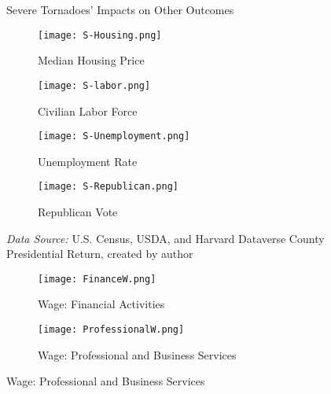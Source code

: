 \documentclass[letterpaper]{article}
\begin{document}

\begin{figure}[H]
    \centering
    
    \caption{Severe Tornadoes' Impacts on Other Outcomes}
    \label{fig4}
    \begin{subfigure}{0.5\textwidth}
        \centering
        \texttt{[image: S-Housing.png]}
        \caption{Median Housing Price}
        \label{22a}
    \end{subfigure}%
    \hfill
    \begin{subfigure}{0.5\textwidth}
        \centering
        \texttt{[image: S-labor.png]}
        \caption{Civilian Labor Force}
        \label{22b}
    \end{subfigure}
    
    \begin{subfigure}{0.5\textwidth}
        \centering
        \texttt{[image: S-Unemployment.png]}
        \caption{Unemployment Rate}
        \label{22c}
    \end{subfigure}%
    \hfill
    \begin{subfigure}{0.5\textwidth}
        \centering
        \texttt{[image: S-Republican.png]}
        \caption{Republican Vote}
        \label{22d}
    \end{subfigure}
    
    \label{USflows}
    \caption*{\textit{Data Source:} U.S. Census, USDA, and Harvard Dataverse County Presidential
Return, created by author}
\end{figure}





 \begin{figure}
        \centering
        \caption{Severe Tornadoes' Impacts on Wage}
        \label{fig5}
        
        \begin{subfigure}[t]{0.5\linewidth}
            \centering
            \texttt{[image: FinanceW.png]}
            \caption{Wage: Financial Activities}
            \label{fig:inflow}
        \end{subfigure}
        \hfill
        \begin{subfigure}[t]{0.5\linewidth}
            \centering
            \texttt{[image: ProfessionalW.png]}
            \caption{Wage: Professional and Business Services}
            \label{fig:outflow}
        \end{subfigure}
        
        \vspace{-10pt} %
    \end{figure}
\end{document}
